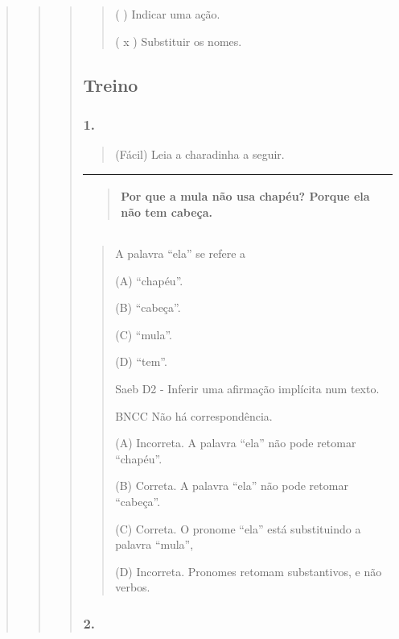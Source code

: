 \begin{quote}
\begin{quote}
\begin{quote}
\begin{quote}
( ) Indicar uma ação.

( x ) Substituir os nomes.
\end{quote}

\subsection{Treino}\label{treino-9}

\subsubsection{1.}\label{section-77}

\begin{quote}
(Fácil) Leia a charadinha a seguir.
\end{quote}

\begin{longtable}[]{@{}l@{}}
\toprule
\begin{minipage}[t]{0.97\columnwidth}\raggedright\strut
\begin{quote}
Por que a mula não usa chapéu? Porque ela não tem cabeça.
\end{quote}\strut
\end{minipage}\tabularnewline
\bottomrule
\end{longtable}

\begin{quote}
A palavra ``ela'' se refere a

(A) ``chapéu''.

(B) ``cabeça''.

(C) ``mula''.

(D) ``tem''.

Saeb D2 - Inferir uma afirmação implícita num texto.

BNCC Não há correspondência.

(A) Incorreta. A palavra ``ela'' não pode retomar ``chapéu''.

(B) Correta. A palavra ``ela'' não pode retomar ``cabeça''.

(C) Correta. O pronome ``ela'' está substituindo a palavra ``mula'',

(D) Incorreta. Pronomes retomam substantivos, e não verbos.
\end{quote}

\subsubsection{2. }\label{section-78}


\end{quote}
\end{quote}
\end{quote}
